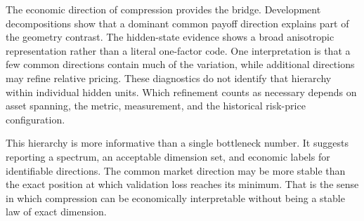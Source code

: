 The economic direction of compression provides the bridge. Development decompositions show that a dominant common payoff direction explains part of the geometry contrast. The hidden-state evidence shows a broad anisotropic representation rather than a literal one-factor code. One interpretation is that a few common directions contain much of the variation, while additional directions may refine relative pricing. These diagnostics do not identify that hierarchy within individual hidden units. Which refinement counts as necessary depends on asset spanning, the metric, measurement, and the historical risk-price configuration.

This hierarchy is more informative than a single bottleneck number. It suggests reporting a spectrum, an acceptable dimension set, and economic labels for identifiable directions. The common market direction may be more stable than the exact position at which validation loss reaches its minimum. That is the sense in which compression can be economically interpretable without being a stable law of exact dimension.
